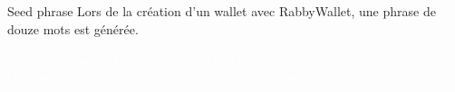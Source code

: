\begin{frame}{Seed phrase}
  Lors de la création d'un wallet avec RabbyWallet, une phrase de douze mots est générée.

  \begin{center}
    \begin{tcolorbox}[arc=1ex, colback=myuniversity, colframe=myuniversity, left=3pt, right=3pt, top=3pt, bottom=2pt]
      \vspace*{1cm}
      \begin{center}
        \begin{huge}
          \textcolor{white}{
            Il faut absolument la sauvegarder en lieu sûr.\\
            Quiconque l'obtient peut accéder à tout votre wallet, vos cryptos et vos NFTs !
          }
        \end{huge}
      \end{center}
      \vspace*{1cm}
    \end{tcolorbox}
  \end{center}
\end{frame}